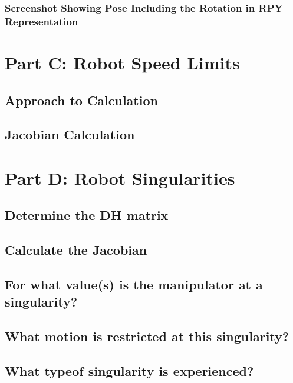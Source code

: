 \documentclass[12pt, a4paper]{article}
\begin{document}
\subsubsection{Screenshot Showing Pose Including the Rotation in RPY Representation}

\section{Part C: Robot Speed Limits}
\subsection{Approach to Calculation}
\subsection{Jacobian Calculation}

\section{Part D: Robot Singularities}
\subsection{Determine the DH matrix}
\subsection{Calculate the Jacobian}
\subsection{For what value(s) is the manipulator at a singularity?}
\subsection{What motion is restricted at this singularity?}
\subsection{What typeof singularity is experienced?}
\end{document}
